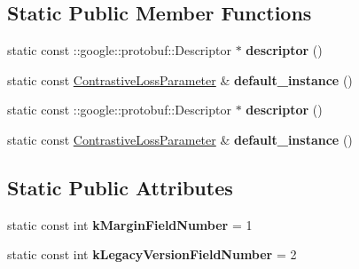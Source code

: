 \subsection*{Static Public Member Functions}
\begin{DoxyCompactItemize}
\item 
\mbox{\label{classcaffe_1_1_contrastive_loss_parameter_aa42082a5bf08b0f3d762e949dfd2a3a6}} 
static const \+::google\+::protobuf\+::\+Descriptor $\ast$ {\bfseries descriptor} ()
\item 
\mbox{\label{classcaffe_1_1_contrastive_loss_parameter_a3c7361f6113c6d77c6900c1aec78e15b}} 
static const \mbox{\hyperlink{classcaffe_1_1_contrastive_loss_parameter}{Contrastive\+Loss\+Parameter}} \& {\bfseries default\+\_\+instance} ()
\item 
\mbox{\label{classcaffe_1_1_contrastive_loss_parameter_a32e8dd95e9f98ec60e3091e6b72d70ea}} 
static const \+::google\+::protobuf\+::\+Descriptor $\ast$ {\bfseries descriptor} ()
\item 
\mbox{\label{classcaffe_1_1_contrastive_loss_parameter_ad514dbb54c2ee356b97e74e6e8ad00a7}} 
static const \mbox{\hyperlink{classcaffe_1_1_contrastive_loss_parameter}{Contrastive\+Loss\+Parameter}} \& {\bfseries default\+\_\+instance} ()
\end{DoxyCompactItemize}
\subsection*{Static Public Attributes}
\begin{DoxyCompactItemize}
\item 
\mbox{\label{classcaffe_1_1_contrastive_loss_parameter_a556e8fbca85b35b2b3786c9269d6d6dd}} 
static const int {\bfseries k\+Margin\+Field\+Number} = 1
\item 
\mbox{\label{classcaffe_1_1_contrastive_loss_parameter_a9da0664a579691964bb301b7d2ca1951}} 
static const int {\bfseries k\+Legacy\+Version\+Field\+Number} = 2
\end{DoxyCompactItemize}
